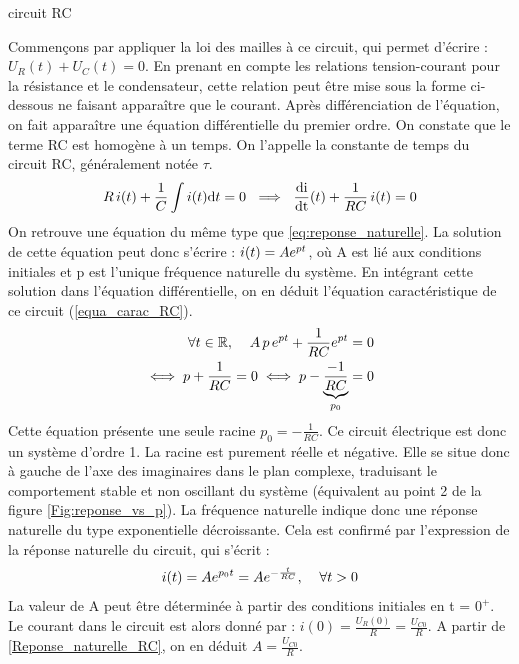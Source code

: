 \begin{exemple}{circuit RC}
          
          Commençons par appliquer la loi des mailles à ce circuit, qui
          permet d'écrire : $U_{R}(t)+U_{C}(t)=0.$ En prenant en compte
          les relations tension-courant pour la résistance et le
          condensateur, cette relation peut être mise sous la forme
          ci-dessous ne faisant apparaître que le courant. Après
          différenciation de l'équation, on fait apparaître une équation
          différentielle du premier ordre. On constate que le terme RC
          est homogène à un temps. On l'appelle la constante de temps du
          circuit RC, généralement notée $\tau$.
          \begin{equation*}
            R\,i(t)+\frac{1}{C}\int i(t) \mathrm{d{}} t=0~\implies ~\frac{\mathrm{d{i}}}{\mathrm{d{t}}}(t)+\frac{1}{RC}\,i(t) = 0
          \end{equation*}
          On retrouve une équation du même type que
          \ref{eq:reponse_naturelle}. La solution de cette
          équation peut donc s'écrire : $i(t) = Ae^{pt}$, où A est lié
          aux conditions initiales et p est l'unique fréquence naturelle
          du système. En intégrant cette solution dans l'équation
          différentielle, on en déduit l'équation caractéristique de ce
          circuit (\ref{equa_carac_RC}).
          \begin{eqnarray*}
            \label{equa_carac_RC}
            \forall t\in\mathbb{R},\;\;\;\; A\,p\,e^{pt}+\frac{1}{RC} e^{pt}=0 \nonumber\\
            \iff p+\frac{1}{RC}=0 \iff p-\underbrace{\frac{-1}{RC}}_{p_{0}}=0
          \end{eqnarray*}
          Cette équation présente une seule racine $p_{0} =
          -\frac{1}{RC}$. Ce circuit électrique est donc un système
          d'ordre 1. La racine est purement réelle et négative. Elle se
          situe donc à gauche de l'axe des imaginaires dans le plan complexe,
          traduisant le comportement stable et non oscillant du système
          (équivalent au point 2 de la figure
          \ref{Fig:reponse_vs_p}). La fréquence naturelle indique donc
          une réponse naturelle du type exponentielle décroissante. Cela
          est confirmé par l'expression de la réponse naturelle du
          circuit, qui s'écrit :
          \begin{equation}\label{Reponse_naturelle_RC}
            i(t)=Ae^{p_{0}t}=Ae^{-\frac{t}{RC}},\;\;\;\; \forall t>0
          \end{equation}
          La valeur de A peut être déterminée à partir des conditions
          initiales en t = $0^{+}$. Le courant dans le circuit est alors
          donné par : $i(0)=\frac{U_{R}(0)}{R}=\frac{U_{C0}}{R}$. A
          partir de \ref{Reponse_naturelle_RC}, on en déduit
          $A=\frac{U_{C0}}{R}$.
        \end{exemple}
        
